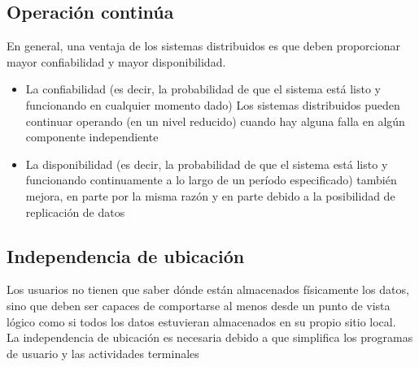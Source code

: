\documentclass[10pt,a4paper,oneside]{article}
\begin{document}
\begin {itemize}
\subsection{Operaci\'on contin\'ua}
En general, una ventaja de los sistemas distribuidos es que deben proporcionar mayor confiabilidad y mayor disponibilidad.
\begin{itemize}
\item La confiabilidad (es decir, la probabilidad de que el sistema est\'a listo y funcionando en cualquier momento dado) Los sistemas distribuidos pueden continuar operando (en un nivel reducido) cuando hay alguna falla en alg\'un componente independiente
\item La disponibilidad (es decir, la probabilidad de que el sistema est\'a listo y funcionando continuamente a lo largo de un per\'iodo especificado) tambi\'en mejora, en parte por la misma raz\'on y en parte debido a la posibilidad de replicaci\'on de datos
\end{itemize}
\subsection{Independencia de ubicaci\'on}
Los usuarios no tienen que saber d\'onde est\'an almacenados f\'isicamente los datos, sino que deben ser capaces de comportarse al menos desde un punto de vista l\'ogico como si todos los datos estuvieran almacenados en su propio sitio local.
\\La independencia de ubicaci\'on es necesaria debido a que simplifica los programas de usuario y las actividades terminales

\end{itemize}
\end{document}
